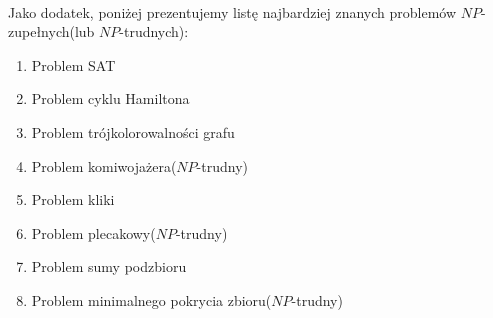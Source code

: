 \\ \noindent
Jako dodatek, poniżej prezentujemy listę najbardziej znanych problemów $NP$-zupełnych(lub $NP$-trudnych):
\begin{enumerate}
\item Problem SAT
\item Problem cyklu Hamiltona
\item Problem trójkolorowalności grafu
\item Problem komiwojażera($NP$-trudny)
\item Problem kliki
\item Problem plecakowy($NP$-trudny)
\item Problem sumy podzbioru
\item Problem minimalnego pokrycia zbioru($NP$-trudny)
\end{enumerate}

 
\noindent
